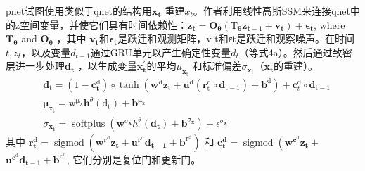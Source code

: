 pnet试图使用类似于qnet的结构用$\mathbf{x}_{\mathbf{t}}$ 重建$x_t$。作者利用线性高斯SSM来连接qnet中的z空间变量，并使它们具有时间依赖性：$\mathbf{z}_{\mathbf{t}}=\mathbf{O}_{\boldsymbol{\theta}}\left(\mathrm{T}_{\boldsymbol{\theta}} \mathbf{z}_{\mathbf{t}-1}+\mathbf{v}_{\mathbf{t}}\right)+\boldsymbol{\epsilon}_{\mathbf{t}}$, where $\mathbf{T}_{\boldsymbol{\theta}}$ and $\mathbf{O}_{\boldsymbol{\theta}}$ ，其中 $\mathbf{v}_{\mathbf{t}}$和$\boldsymbol{\epsilon}_{\mathbf{t}}$是跃迁和观测矩阵，v t和εt是跃迁和观察噪声。在时间$t, z_t$，以及变量$d_{t-1}$通过GRU单元以产生确定性变量$d_t$（等式4a）。然后通过致密层进一步处理$\mathbf{d}_{\mathbf{t}}$ ，以生成变量$\mathbf{x}_{\mathbf{t}}^{\prime}$的平均$\mu_{\mathbf{x}_{\mathrm{t}}}$ 和标准偏差$\sigma_{\mathbf{x}_t}$（$\mathbf{x}_{\mathbf{t}}$的重建）。
\begin{equation}
    \begin{aligned}
    & \mathbf{d}_{\mathrm{t}}=\left(1-\mathbf{c}_{\mathbf{t}}^{\mathrm{d}}\right) \circ \tanh \left(\mathbf{w}^{\mathrm{d}} \mathbf{z}_{\mathrm{t}}+\mathbf{u}^{\mathrm{d}}\left(\mathbf{r}_{\mathrm{t}}^{\mathrm{d}} \circ \mathbf{d}_{\mathrm{t}-1}\right)+\mathbf{b}^{\mathrm{d}}\right)+\mathbf{c}_t^{\mathrm{d}} \circ \mathbf{d}_{\mathrm{t}-1} \\
    & \boldsymbol{\mu}_{\mathrm{x}_{\mathrm{t}}}=\mathrm{w}^{\boldsymbol{\mu}_{\mathrm{x}}} \boldsymbol{h}^\theta\left(\mathrm{d}_{\mathrm{t}}\right)+\mathbf{b}^{\boldsymbol{\mu}_{\mathrm{x}}} \\
    & \sigma_{\mathbf{x}_{\mathbf{t}}}=\operatorname{softplus}\left(\mathbf{w}^{\sigma_{\mathbf{x}}} h^\theta\left(\mathbf{d}_{\mathbf{t}}\right)+\mathbf{b}^{\sigma_{\mathbf{x}}}\right)+\epsilon^{\sigma_{\mathbf{x}}} 
    \end{aligned}
    \end{equation}
其中 $\mathbf{r}_{\mathbf{t}}^{\mathbf{d}}=\operatorname{sigmod}\left(\mathbf{w}^{\mathbf{r}^{\mathrm{d}}} \mathbf{z}_{\mathbf{t}}+\mathbf{u}^{\mathbf{r}^{\mathrm{d}}} \mathbf{d}_{\mathbf{t}-\mathbf{1}}+\mathbf{b}^{\mathbf{r}^{\mathrm{d}}}\right)$ 和 $\mathbf{c}_{\mathbf{t}}^{\mathbf{d}}=\operatorname{sigmod}\left(\mathbf{w}^{\mathbf{c}^{\mathrm{d}}} \mathbf{z}_{\mathbf{t}}+\right.$ $\mathbf{u}^{\mathbf{c}^{\mathrm{d}}} \mathbf{d}_{\mathbf{t}-1}+\mathbf{b}^{\mathbf{c}^{\mathrm{d}}}$, 它们分别是复位门和更新门。

